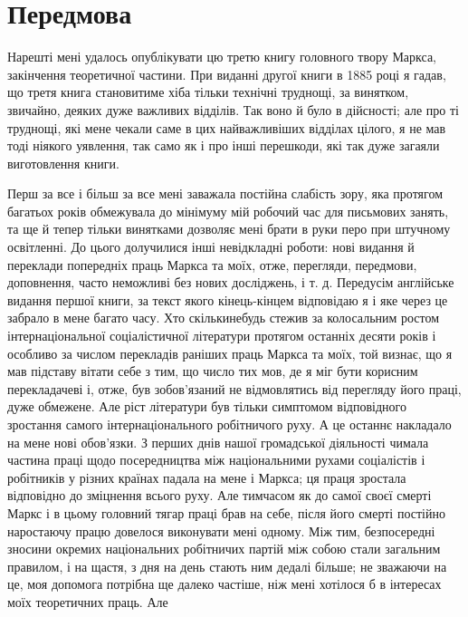 
\section*{Передмова}

Нарешті мені удалось опублікувати цю третю книгу головного
твору Маркса, закінчення теоретичної частини. При виданні
другої книги в 1885 році я гадав, що третя книга становитиме
хіба тільки технічні труднощі, за винятком, звичайно, деяких
дуже важливих відділів. Так воно й було в дійсності; але про ті
труднощі, які мене чекали саме в цих найважливіших відділах
цілого, я не мав тоді ніякого уявлення, так само як і про інші
перешкоди, які так дуже загаяли виготовлення книги.

Перш за все і більш за все мені заважала постійна слабість
зору, яка протягом багатьох років обмежувала до мінімуму мій
робочий час для письмових занять, та ще й тепер тільки винятками
дозволяє мені брати в руки перо при штучному освітленні.
До цього долучилися інші невідкладні роботи: нові видання й
переклади попередніх праць Маркса та моїх, отже, перегляди,
передмови, доповнення, часто неможливі без нових досліджень,
і т. д. Передусім англійське видання першої книги, за текст
якого кінець-кінцем відповідаю я і яке через це забрало в мене
багато часу. Хто скількинебудь стежив за колосальним ростом
інтернаціональної соціалістичної літератури протягом останніх
десяти років і особливо за числом перекладів раніших праць
Маркса та моїх, той визнає, що я мав підставу вітати себе
з тим, що число тих мов, де я міг бути корисним перекладачеві
і, отже, був зобов’язаний не відмовлятись від перегляду його
праці, дуже обмежене. Але ріст літератури був тільки симптомом
відповідного зростання самого інтернаціонального робітничого
руху. А це останнє накладало на мене нові обов’язки.
З перших днів нашої громадської діяльності чимала частина праці
щодо посередництва між національними рухами соціалістів і робітників
у різних країнах падала на мене і Маркса; ця праця зростала
відповідно до зміцнення всього руху. Але тимчасом як
до самої своєї смерті Маркс і в цьому головний тягар праці
брав на себе, після його смерті постійно наростаючу працю довелося
виконувати мені одному. Між тим, безпосередні зносини
окремих національних робітничих партій між собою стали загальним
правилом, і на щастя, з дня на день стають ним дедалі більше;
не зважаючи на це, моя допомога потрібна ще далеко частіше,
ніж мені хотілося б в інтересах моїх теоретичних праць. Але
\parbreak{}  %
